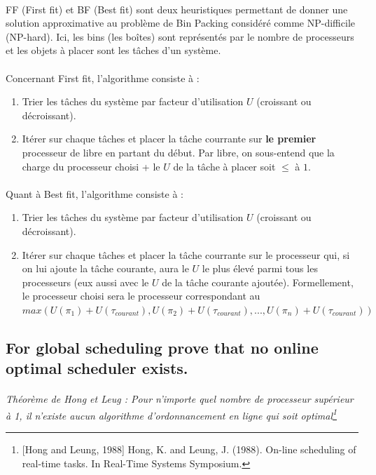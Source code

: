 \paragraph{}
FF (First fit) et BF (Best fit) sont deux heuristiques permettant de donner une solution approximative au problème de Bin Packing considéré comme NP-difficile (NP-hard). Ici, les bins (les boîtes) sont représentés par le nombre de processeurs et les objets à placer sont les tâches d'un système.

\paragraph{}
Concernant First fit, l'algorithme consiste à :
  \begin{enumerate}
    \item Trier les tâches du système par facteur d'utilisation $U$ (croissant ou 
          décroissant).
    \item Itérer sur chaque tâches et placer la tâche courrante sur \textbf{le premier} 
          processeur de libre en partant du début. Par libre, on sous-entend que la 
          charge du processeur choisi + le $U$ de la tâche à placer soit $\leq$ à $1$.
  \end{enumerate}
\paragraph{}
Quant à Best fit, l'algorithme consiste à :
	\begin{enumerate}
      \item Trier les tâches du système par facteur d'utilisation $U$ (croissant ou 
            décroissant).
      \item Itérer sur chaque tâches et placer la tâche courrante sur le processeur qui, 
            si on lui ajoute la tâche courante, aura le $U$ le plus élevé parmi tous les 
            processeurs (eux aussi avec le $U$ de la tâche courante ajoutée).
            Formellement, le processeur choisi sera le processeur correspondant au $max(U(\pi_{1}) + U(\tau_{courant}), U(\pi_{2}) + U(\tau_{courant}), ..., U(\pi_{n}) + U(\tau_{courant}))$
	\end{enumerate}
    
\subsection{For global scheduling prove that no online optimal scheduler exists.}

\paragraph{}
\textit{Théorème de Hong et Leug : Pour n'importe quel nombre de processeur supérieur à 1, il n'existe aucun algorithme d'ordonnancement en ligne qui soit optimal\footnote{[Hong and Leung, 1988] Hong, K. and Leung, J. (1988). On-line scheduling of real-time tasks. In Real-Time Systems Symposium.}}

